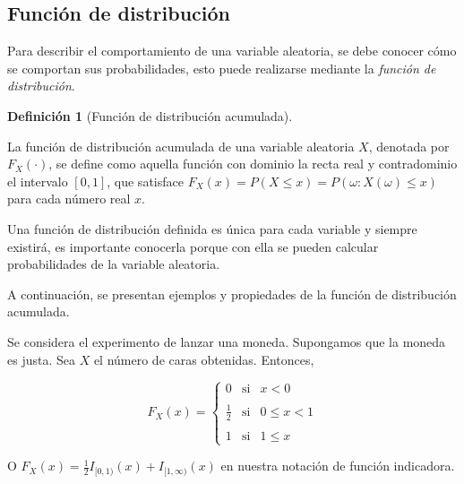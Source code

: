 \documentclass[
  us-letterpaper,
]{scrreprt}
\theoremstyle{plain}
\theoremstyle{definition}
\newtheorem{definition}{Definición}[chapter]
\theoremstyle{definition}
\theoremstyle{plain}
\theoremstyle{remark}
\begin{document}
\subsection{Función de
distribución}\label{funciuxf3n-de-distribuciuxf3n}

Para describir el comportamiento de una variable aleatoria, se debe
conocer cómo se comportan sus probabilidades, esto puede realizarse
mediante la \emph{función de distribución}.

\begin{definition}[Función de distribución
acumulada]\protect\hypertarget{def-fundist}{}\label{def-fundist}

La función de distribución acumulada de una variable aleatoria \(X\),
denotada por \(F_X(\cdot)\), se define como aquella función con dominio
la recta real y contradominio el intervalo \([0,1]\), que satisface
\(F_X(x)=P(X\leq x)=P({\omega: X(\omega)\leq x})\) para cada número real
\(x\).

\end{definition}

Una función de distribución definida es única para cada variable y
siempre existirá, es importante conocerla porque con ella se pueden
calcular probabilidades de la variable aleatoria.

A continuación, se presentan ejemplos y propiedades de la función de
distribución acumulada.

\begin{tcolorbox}[enhanced jigsaw, breakable, colbacktitle=quarto-callout-caution-color!10!white, rightrule=.15mm, toptitle=1mm, colback=white, left=2mm, colframe=quarto-callout-caution-color-frame, bottomtitle=1mm, opacitybacktitle=0.6, leftrule=.75mm, arc=.35mm, title={Ejemplo}, coltitle=black, titlerule=0mm, opacityback=0, bottomrule=.15mm, toprule=.15mm]

Se considera el experimento de lanzar una moneda. Supongamos que la
moneda es justa. Sea \(X\) el número de caras obtenidas. Entonces,

\[F_X(x)=\left\{ \begin{array}{lcc} 0 & \text{si} & x<0\\ \\ \frac{1}{2} & \text{si} & 0\leq x<1 \\ \\1 & \text{si} & 1\leq x \end{array} \right. \]

O \(F_X(x)=\frac{1}{2}I_{[0,1)}(x)+ I_{[1,\infty)}(x)\) en nuestra
notación de función indicadora.

\end{tcolorbox}
\end{document}
